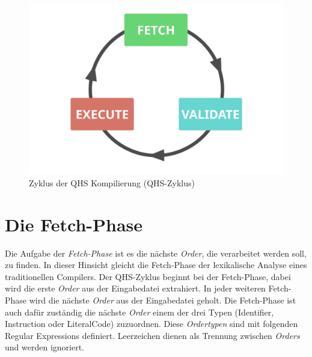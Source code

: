 \begin{figure}[h!]
    \centering
    \includegraphics[scale=0.6]{resources/images/qhs-cycle.png}
    \caption{Zyklus der QHS Kompilierung (QHS-Zyklus)}
    \label{fig:qhs-cycle}
\end{figure}

\section{Die Fetch-Phase} \label{sec:qhs-fetch}
Die Aufgabe der \textit{Fetch-Phase} ist es die nächste \textit{Order}, die verarbeitet werden soll, zu finden. In dieser Hinsicht gleicht die Fetch-Phase der lexikalische Analyse eines traditionellen Compilers.
Der QHS-Zyklus beginnt bei der Fetch-Phase, dabei wird die erste \textit{Order} aus der Eingabedatei extrahiert. In jeder weiteren Fetch-Phase wird die nächste \textit{Order} aus der Eingabedatei geholt.
Die Fetch-Phase ist auch dafür zuständig die nächste \textit{Order} einem der drei Typen (Identifier, Instruction oder LiteralCode) zuzuordnen.
Diese \textit{Ordertypen} sind mit folgenden Regular Expressions definiert. Leerzeichen dienen als Trennung zwischen \textit{Orders} und werden ignoriert.

